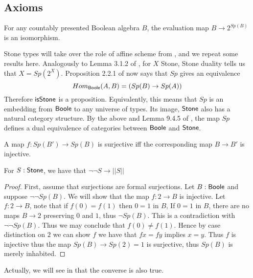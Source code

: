 \documentclass{../util/zariski-small}
\begin{document}
\subsection{Axioms}
\begin{axiomNum}
  For any countably presented Boolean algebra $B$, the evaluation map $B\rightarrow  2^{Sp(B)}$ is an isomorphism.
\end{axiomNum} 

\begin{remark}
Stone types will take over the role of affine scheme from \cite{draft}, 
and we repeat some results here. 
Analogously to Lemma 3.1.2 of \cite{draft}, 
for $X$ Stone, Stone duality tells us that $X = Sp(2^X)$. 
%
Proposition 2.2.1 of \cite{draft} now says that 
$Sp$ gives an equivalence 
\begin{equation}
   Hom_{\mathsf{Boole}} (A, B) = (Sp(B) \to Sp(A))
\end{equation}
Therefore $\mathsf{isStone}$ is a proposition.
Equivalently, 
this means that 
$Sp$ is an embedding from $\mathsf{Boole}$ to any universe of types.
Its image, $\mathsf{Stone}$ also has a natural category structure.
By the above and Lemma 9.4.5 of \cite{hott}, 
the map $Sp$ defines a dual equivalence of categories between $\mathsf{Boole}$ and $\mathsf{Stone}$.
\end{remark}

\begin{axiomNum}
  A map $f:Sp(B')\to Sp(B)$ is surjective iff the corresponding map $B \to B'$ is injective.
\end{axiomNum} 

\begin{lemma}\label{LemSurjectionsFormalToCompleteness}
 For $S:\mathsf{Stone}$, we have that $\neg \neg S \to || S ||$
\end{lemma}
\begin{proof}
  First, assume that surjections are formal surjections. 
  Let $B:\mathsf{Boole}$ and suppose $\neg \neg Sp(B)$. 
  We will show that the map $f:2\to B$ is injective. 
  Let $f:2 \to B$, note that if $f(0) = f(1)$ then $0=1$ in $B$, 
  If $0=1$ in $B$, there are no maps $B\to 2$ preserving $0$ and $1$, thus $\neg Sp(B)$. 
  This is a contradiction with $\neg \neg Sp(B)$. Thus we may conclude that $f(0)\neq f(1)$. 
  Hence by case distinction on $2$ we can show $f$ we have that $f x = f y$ implies $ x= y$. Thus 
  $f$ is injective thus the map $Sp(B) \to Sp(2) = 1$ is surjective, thus $Sp(B)$ is merely inhabited. 
\end{proof} 
Actually, we will see in  that the converse is also true. 
\end{document}
